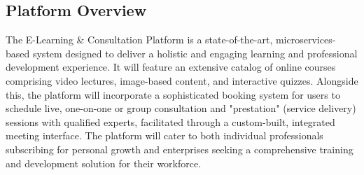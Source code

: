 \documentclass[12pt, a4paper]{report} %
\begin{document}
  \subsection{Platform Overview}
    The E-Learning \& Consultation Platform is a state-of-the-art, microservices-based system designed to deliver a holistic and engaging learning and professional development experience. It will feature an extensive catalog of online courses comprising video lectures, image-based content, and interactive quizzes. Alongside this, the platform will incorporate a sophisticated booking system for users to schedule live, one-on-one or group consultation and "prestation" (service delivery) sessions with qualified experts, facilitated through a custom-built, integrated meeting interface. The platform will cater to both individual professionals subscribing for personal growth and enterprises seeking a comprehensive training and development solution for their workforce.
\end{document}
